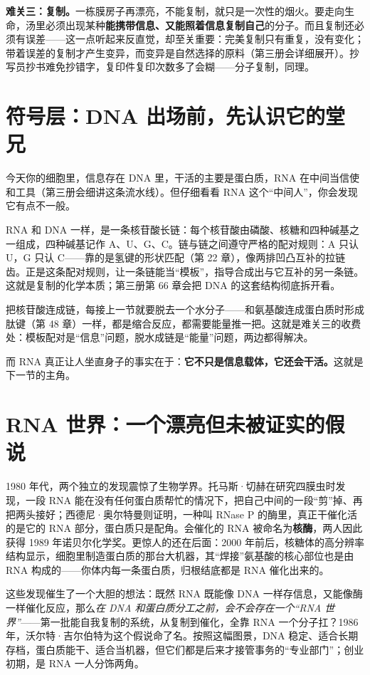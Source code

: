 \textbf{难关三：复制。}一栋膜房子再漂亮，不能复制，就只是一次性的烟火。要走向生命，汤里必须出现某种\textbf{能携带信息、又能照着信息复制自己}的分子。而且复制还必须有误差——这一点听起来反直觉，却至关重要：完美复制只有重复，没有变化；带着误差的复制才产生变异，而变异是自然选择的原料（第三册会详细展开）。抄写员抄书难免抄错字，复印件复印次数多了会糊——分子复制，同理。

\section{符号层：DNA 出场前，先认识它的堂兄}

今天你的细胞里，信息存在 DNA 里，干活的主要是蛋白质，RNA 在中间当信使和工具（第三册会细讲这条流水线）。但仔细看看 RNA 这个“中间人”，你会发现它有点不一般。

RNA 和 DNA 一样，是一条核苷酸长链：每个核苷酸由磷酸、核糖和四种碱基之一组成，四种碱基记作 A、U、G、C。链与链之间遵守严格的配对规则：A 只认 U，G 只认 C——靠的是氢键的形状匹配（第 22 章），像两排凹凸互补的拉链齿。正是这条配对规则，让一条链能当“模板”，指导合成出与它互补的另一条链。这就是复制的化学本质；第三册第 66 章会把 DNA 的这套结构彻底拆开看。

把核苷酸连成链，每接上一节就要脱去一个水分子——和氨基酸连成蛋白质时形成肽键（第 48 章）一样，都是缩合反应，都需要能量推一把。这就是难关三的收费处：模板配对是“信息”问题，脱水成链是“能量”问题，两边都得解决。

而 RNA 真正让人坐直身子的事实在于：\textbf{它不只是信息载体，它还会干活。}这就是下一节的主角。

\section{RNA 世界：一个漂亮但未被证实的假说}

1980 年代，两个独立的发现震惊了生物学界。托马斯·切赫在研究四膜虫时发现，一段 RNA 能在没有任何蛋白质帮忙的情况下，把自己中间的一段“剪”掉、再把两头接好；西德尼·奥尔特曼则证明，一种叫 RNase P 的酶里，真正干催化活的是它的 RNA 部分，蛋白质只是配角。会催化的 RNA 被命名为\textbf{核酶}，两人因此获得 1989 年诺贝尔化学奖。更惊人的还在后面：2000 年前后，核糖体的高分辨率结构显示，细胞里制造蛋白质的那台大机器，其“焊接”氨基酸的核心部位也是由 RNA 构成的——你体内每一条蛋白质，归根结底都是 RNA 催化出来的。

这些发现催生了一个大胆的想法：既然 RNA 既能像 DNA 一样存信息，又能像酶一样催化反应，那么\emph{在 DNA 和蛋白质分工之前，会不会存在一个“RNA 世界”}——第一批能自我复制的系统，从复制到催化，全靠 RNA 一个分子扛？1986 年，沃尔特·吉尔伯特为这个假说命了名。按照这幅图景，DNA 稳定、适合长期存档，蛋白质能干、适合当机器，但它们都是后来才接管事务的“专业部门”；创业初期，是 RNA 一人分饰两角。

